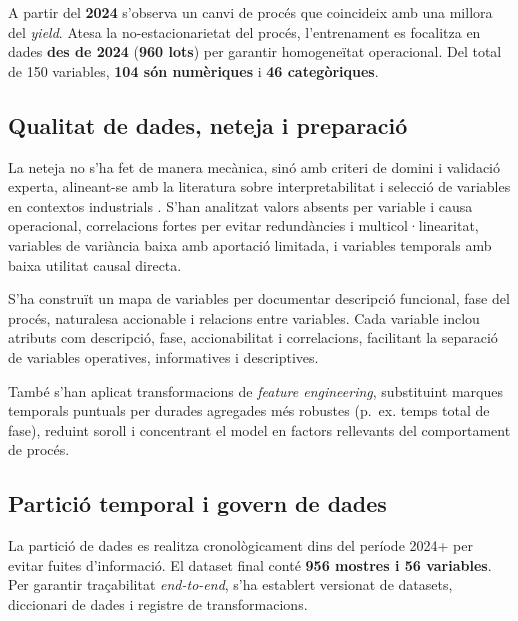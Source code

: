 A partir del \textbf{2024} s'observa un canvi de procés que coincideix amb una millora del \emph{yield}. Atesa la no-estacionarietat del procés, l'entrenament es focalitza en dades \textbf{des de 2024} (\textbf{960 lots}) per garantir homogeneïtat operacional. Del total de 150 variables, \textbf{104 són numèriques} i \textbf{46 categòriques}.

\subsection{Qualitat de dades, neteja i preparació}

La neteja no s'ha fet de manera mecànica, sinó amb criteri de domini i validació experta, alineant-se amb la literatura sobre interpretabilitat i selecció de variables en contextos industrials \cite{nori2019_unified,guyon2003_feature_selection,liu2021_missing_industrial,boloncanedo2015_review}. S'han analitzat valors absents per variable i causa operacional, correlacions fortes per evitar redundàncies i multicol·linearitat, variables de variància baixa amb aportació limitada, i variables temporals amb baixa utilitat causal directa.

S'ha construït un mapa de variables per documentar descripció funcional, fase del procés, naturalesa accionable i relacions entre variables. Cada variable inclou atributs com descripció, fase, accionabilitat i correlacions, facilitant la separació de variables operatives, informatives i descriptives.

També s'han aplicat transformacions de \emph{feature engineering}, substituint marques temporals puntuals per durades agregades més robustes (p.~ex. temps total de fase), reduint soroll i concentrant el model en factors rellevants del comportament de procés.

\subsection{Partició temporal i govern de dades}

La partició de dades es realitza cronològicament dins del període 2024+ per evitar fuites d'informació. El dataset final conté \textbf{956 mostres i 56 variables}. Per garantir traçabilitat \emph{end-to-end}, s'ha establert versionat de datasets, diccionari de dades i registre de transformacions.
